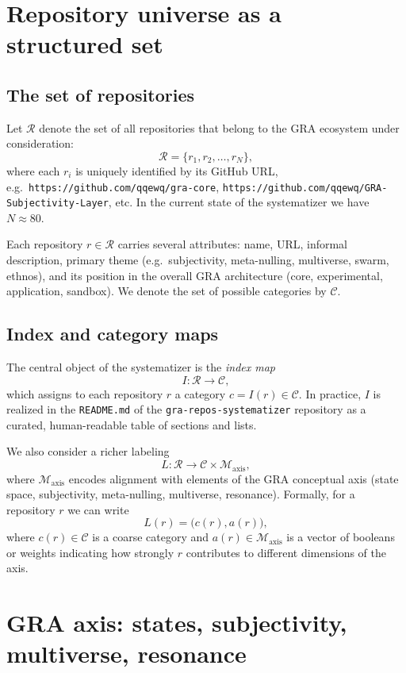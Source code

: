 \documentclass[11pt,a4paper]{article}
\begin{document}
\section{Repository universe as a structured set}

\subsection{The set of repositories}

Let $\mathcal{R}$ denote the set of all repositories that belong to the
GRA ecosystem under consideration:
\[
  \mathcal{R} = \{ r_1, r_2, \dots, r_N \},
\]
where each $r_i$ is uniquely identified by its GitHub URL,
e.g.\ \texttt{https://github.com/qqewq/gra-core},
\texttt{https://github.com/qqewq/GRA-Subjectivity-Layer}, etc.
In the current state of the systematizer we have $N \approx 80$.

Each repository $r \in \mathcal{R}$ carries several attributes:
name, URL, informal description, primary theme
(e.g.\ subjectivity, meta-nulling, multiverse, swarm, ethnos),
and its position in the overall GRA architecture
(core, experimental, application, sandbox).
We denote the set of possible categories by $\mathcal{C}$.

\subsection{Index and category maps}

The central object of the systematizer is the \emph{index map}
\[
  I : \mathcal{R} \rightarrow \mathcal{C},
\]
which assigns to each repository $r$ a category $c = I(r) \in \mathcal{C}$.
In practice, $I$ is realized in the \texttt{README.md} of the
\texttt{gra-repos-systematizer} repository as a curated, human-readable
table of sections and lists.

We also consider a richer labeling
\[
  L : \mathcal{R} \rightarrow \mathcal{C} \times \mathcal{M}_{\text{axis}},
\]
where $\mathcal{M}_{\text{axis}}$ encodes alignment with elements of
the GRA conceptual axis (state space, subjectivity, meta-nulling,
multiverse, resonance).
Formally, for a repository $r$ we can write
\[
  L(r) = \bigl( c(r), a(r) \bigr),
\]
where $c(r) \in \mathcal{C}$ is a coarse category and
$a(r) \in \mathcal{M}_{\text{axis}}$ is a vector of booleans or weights
indicating how strongly $r$ contributes to different dimensions of the axis.

\section{GRA axis: states, subjectivity, multiverse, resonance}
\end{document}

